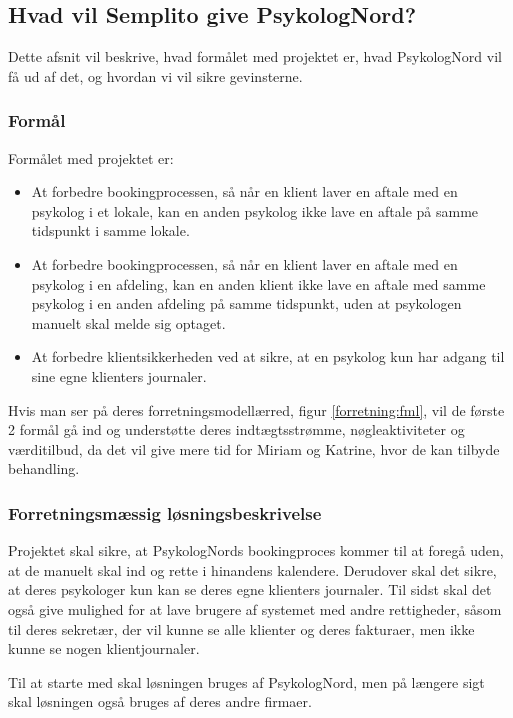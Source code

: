 \subsection{Hvad vil Semplito give PsykologNord?}
Dette afsnit vil beskrive, hvad formålet med projektet er, hvad PsykologNord vil få ud af det, og hvordan vi vil sikre gevinsterne.

\subsubsection{Formål}
Formålet med projektet er:

\begin{itemize}
    \item At forbedre bookingprocessen, så når en klient laver en aftale med en psykolog i et lokale, kan en anden psykolog ikke lave en aftale på samme tidspunkt i samme lokale.
    \item At forbedre bookingprocessen, så når en klient laver en aftale med en psykolog i en afdeling, kan en anden klient ikke lave en aftale med samme psykolog i en anden afdeling på samme tidspunkt, uden at psykologen manuelt skal melde sig optaget.
    \item At forbedre klientsikkerheden ved at sikre, at en psykolog kun har adgang til sine egne klienters journaler.
\end{itemize}

Hvis man ser på deres forretningsmodellærred, figur \ref{forretning:fml}, vil de første 2 formål gå ind og understøtte deres indtægtsstrømme, nøgleaktiviteter og værditilbud, da det vil give mere tid for Miriam og Katrine, hvor de kan tilbyde behandling.

\subsubsection{Forretningsmæssig løsningsbeskrivelse}

Projektet skal sikre, at PsykologNords bookingproces kommer til at foregå uden, at de manuelt skal ind og rette i hinandens kalendere.
Derudover skal det sikre, at deres psykologer kun kan se deres egne klienters journaler. 
Til sidst skal det også give mulighed for at lave brugere af systemet med andre rettigheder, såsom til deres sekretær, der vil kunne se alle klienter og deres fakturaer, men ikke kunne se nogen klientjournaler.

Til at starte med skal løsningen bruges af PsykologNord, men på længere sigt skal løsningen også bruges af deres andre firmaer.


